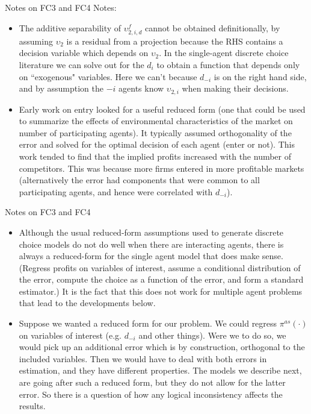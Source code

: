 \begin{frame}{Notes on FC3 and FC4}
Notes:

\small
\begin{itemize}

\item The additive separability of $\upsilon _{2,i,d}^{f}$ cannot be
obtained definitionally, by assuming $\upsilon _{2}$ is a residual from a
projection because the RHS contains a
decision variable which depends on $\upsilon _{2}$. In the single-agent discrete choice literature we can solve out for the $d_{i}$ to obtain a function that depends only on ``exogenous" variables.
Here we can't because $d_{-i}$ is on the right hand side,
and by assumption the $-i$ agents know $\upsilon _{2,i}$ when making their
decisions.
\item Early work on entry looked for a useful reduced form (one that could be used to summarize the effects of environmental characteristics of the market on number of participating agents). It typically assumed orthogonality of the error and solved for the optimal decision of each agent (enter or not). This work tended to find that the implied profits increased with the number of competitors. This was because more firms entered in more profitable markets (alternatively the error had components that were common to all participating agents, and hence were correlated with $d_{-i}$).
\end{itemize}
\end{frame}

\begin{frame}{Notes on FC3 and FC4}
\small
\begin{itemize}
\item Although the usual reduced-form assumptions used to generate discrete choice models do not do well when there are interacting agents, there is always a reduced-form for the single agent model that does make sense.  (Regress profits on variables of interest, assume a conditional distribution of the error, compute the choice as a function of the error, and form a standard estimator.)  It is the fact that this does not work for multiple agent problems that lead to the developments below.
\item Suppose we wanted a reduced form for our problem. We could regress $\pi^{as}(\cdot)$ on variables of interest (e.g. $d_{-i}$ and other things). Were we to do so, we would pick up an additional error which is by construction, orthogonal to the included variables. Then we would have to deal with both errors in estimation, and they have different properties. The models we describe next, are going after such a reduced form, but they do not allow for the latter error. So there is a question of how any logical inconsistency affects the results.
\end{itemize}
\end{frame}

